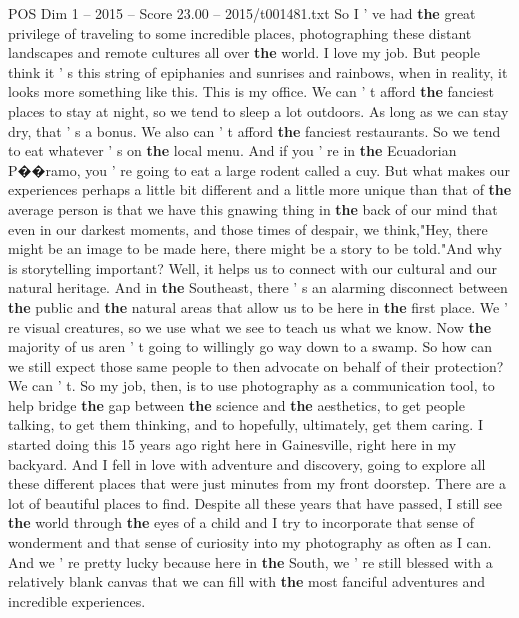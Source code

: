 \begin{textsample}{POS Dim 1 – 2015 – Score 23.00 – 2015/t001481.txt}  \label{ex:f1_pos_039}
So I ' ve had \textbf{the} great privilege of traveling to some incredible places, photographing these distant landscapes and remote cultures all over \textbf{the} world.
I love my job.
But people think it ' s this string of epiphanies and sunrises and rainbows, when in reality, it looks more something like this.
This is my office.
We can ' t afford \textbf{the} fanciest places to stay at night, so we tend to sleep a lot outdoors.
As long as we can stay dry, that ' s a bonus.
We also can ' t afford \textbf{the} fanciest restaurants.
So we tend to eat whatever ' s on \textbf{the} local menu.
And if you ' re in \textbf{the} Ecuadorian P{\EmojiFont �}{\EmojiFont �}ramo, you ' re going to eat a large rodent called a cuy.
But what makes our experiences perhaps a little bit different and a little more unique than that of \textbf{the} average person is that we have this gnawing thing in \textbf{the} back of our mind that even in our darkest moments, and those times of despair, we think,"Hey, there might be an image to be made here, there might be a story to be told."And why is storytelling important?
Well, it helps us to connect with our cultural and our natural heritage.
And in \textbf{the} Southeast, there ' s an alarming disconnect between \textbf{the} public and \textbf{the} natural areas that allow us to be here in \textbf{the} first place.
We ' re visual creatures, so we use what we see to teach us what we know.
Now \textbf{the} majority of us aren ' t going to willingly go way down to a swamp.
So how can we still expect those same people to then advocate on behalf of their protection?
We can ' t.
So my job, then, is to use photography as a communication tool, to help bridge \textbf{the} gap between \textbf{the} science and \textbf{the} aesthetics, to get people talking, to get them thinking, and to hopefully, ultimately, get them caring.
I started doing this 15 years ago right here in Gainesville, right here in my backyard.
And I fell in love with adventure and discovery, going to explore all these different places that were just minutes from my front doorstep.
There are a lot of beautiful places to find.
Despite all these years that have passed, I still see \textbf{the} world through \textbf{the} eyes of a child and I try to incorporate that sense of wonderment and that sense of curiosity into my photography as often as I can.
And we ' re pretty lucky because here in \textbf{the} South, we ' re still blessed with a relatively blank canvas that we can fill with \textbf{the} most fanciful adventures and incredible experiences.

\end{textsample}
